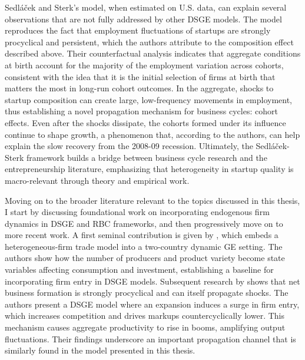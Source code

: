 \documentclass[a4paper,12pt]{article} %
\numberwithin{equation}{section} %
\numberwithin{figure}{section}
\numberwithin{table}{section}
\begin{document}
Sedláček and Sterk’s model, when estimated on U.S. data, can explain several observations that are not fully addressed by other DSGE models. 
The model reproduces the fact that employment fluctuations of startups are strongly procyclical and persistent, which the authors 
attribute to the composition effect described above. Their counterfactual analysis indicates that aggregate conditions at birth 
account for the majority of the employment variation across cohorts, consistent with the idea that it is the initial selection of 
firms at birth that matters the most in long-run cohort outcomes. In the aggregate, shocks to startup composition can create large, 
low-frequency movements in employment, thus establishing a novel propagation mechanism for business cycles: cohort effects. 
Even after the shocks dissipate, the cohorts formed under its influence continue to shape growth, a phenomenon that, according to the 
authors, can help explain the slow recovery from the 2008-09 recession. Ultimately, the Sedláček-Sterk framework builds a bridge 
between business cycle research and the entrepreneurship literature, emphasizing that heterogeneity in startup quality is 
macro-relevant through theory and empirical work.

Moving on to the broader literature relevant to the topics discussed in this thesis, I start by discussing foundational work on 
incorporating endogenous firm dynamics in DSGE and RBC frameworks, and then progressively move on to more recent work. 
A first seminal contribution is given by \textcite{ghironi2007trade}, which embeds a heterogeneous-firm trade model into
a two-country dynamic GE setting. The authors show how the number of producers and product variety become state variables
affecting consumption and investment, establishing a baseline for incorporating firm entry in DSGE models. 
Subsequent research by \textcite{jaimovich2008firm} shows that net business formation is strongly procyclical 
and can itself propagate shocks. The authors present a DSGE model where an expansion induces a surge in firm entry, 
which increases competition and drives markups countercyclically lower. This mechanism causes aggregate productivity to 
rise in booms, amplifying output fluctuations. Their findings underscore an important propagation channel 
that is similarly found in the model presented in this thesis.
\end{document}
